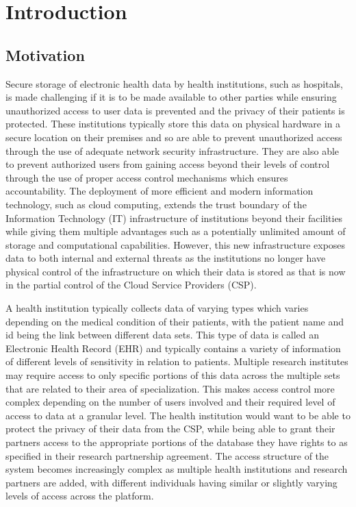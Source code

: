 \chapter{Introduction}
\label{chap:introduction}


\section{Motivation}

Secure storage of electronic health data by health institutions, such as hospitals, is made challenging if it is to be made available to other parties while ensuring unauthorized access to user data is prevented and the privacy of their patients is protected. These institutions typically store this data on physical hardware in a secure location on their premises and so are able to prevent unauthorized access through the use of adequate network security infrastructure. They are also able to prevent authorized users from gaining access beyond their levels of control through the use of proper access control mechanisms which ensures accountability. The deployment of more efficient and modern information technology, such as cloud computing, extends the trust boundary of the Information Technology (IT) infrastructure of institutions beyond their facilities while giving them multiple advantages such as a potentially unlimited amount of storage and computational capabilities. However, this new infrastructure exposes data to both internal and external threats as the institutions no longer have physical control of the infrastructure on which their data is stored as that is now in the partial control of the Cloud Service Providers (CSP).

A health institution typically collects data of varying types which varies depending on the medical condition of their patients, with the patient name and id being the link between different data sets. This type of data is called an Electronic Health Record (EHR)\cite{caninfoway, ehrhealthitmain} and typically contains a variety of information of different levels of sensitivity in relation to patients. Multiple research institutes may require access to only specific portions of this data across the multiple sets that are related to their area of specialization. This makes access control more complex depending on the number of users involved and their required level of access to data at a granular level. The health institution would want to be able to protect the privacy of their data from the CSP, while being able to grant their partners access to the appropriate portions of the database they have rights to as specified in their research partnership agreement. The access structure of the system becomes increasingly complex as multiple health institutions and research partners are added, with different individuals having similar or slightly varying levels of access across the platform.

